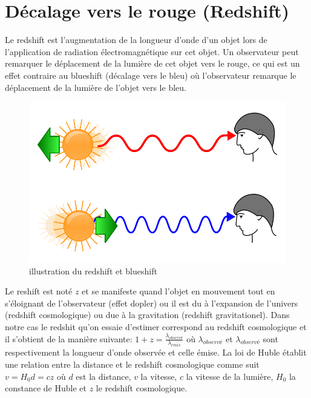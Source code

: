 \section*{Décalage vers le rouge (Redshift)}
Le redshift est l'augmentation de la longueur d'onde d'un objet lors de l'application de radiation électromagnétique sur cet objet. Un observateur peut remarquer le déplacement de la lumière de cet objet vers le rouge, ce qui est un effet contraire au blueshift (décalage vers le bleu) où l'observateur remarque le déplacement de la lumière de l'objet vers le bleu.
\begin{figure}[H]
	\includegraphics[scale=0.3]{images/reshift.png}
	\caption{illustration du redshift et blueshift}
	\label{red_blue}
\end{figure}
Le reshift est noté $z$ et se manifeste quand l'objet en mouvement tout en s'éloignant de l'observateur (effet dopler) ou il est du à l'expansion de l'univers (redshift cosmologique) ou due à la gravitation (redshift gravitationel). Dans notre cas le redshit qu'on essaie d'estimer correspond au redshift cosmologique et il s'obtient de la manière suivante: $1 + z = \frac{\lambda_{observé}}{\lambda_{emis}}$ où $\lambda_{observé}$ et $\lambda_{observé}$ sont respectivement la longueur d'onde observée et celle émise. La loi de Huble établit une relation entre la distance et le redshift cosmologique comme suit $v = H_0d = cz$ où $d$ est la distance, $v$ la vitesse, $c$ la vitesse de la lumière, $H_0$ la constance de Huble et $z$ le redshift cosmologique.
